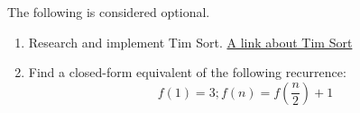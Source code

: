 \documentclass[11pt]{article}
\begin{document}
    The following is considered optional.
    
    \begin{enumerate}
        
        \item Research and implement Tim Sort. \href{https://en.wikipedia.org/wiki/Timsort}{A link about Tim Sort}
    
        \item Find a closed-form equivalent of the following recurrence:
        $$f(1) = 3; f(n) = f(\frac{n}{2}) + 1$$
    
    \end{enumerate}
    
    \label{r:lastpage}
    
    
\end{document}
